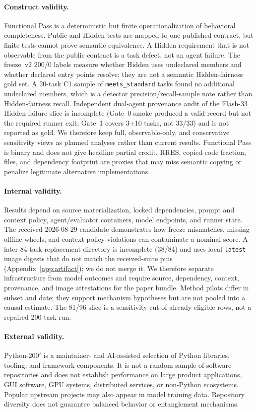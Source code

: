 \documentclass[acmsmall,anonymous,review,screen]{acmart}
\newcommand{\rres}{\textsc{RRES}\xspace}
\begin{document}
\paragraph{Construct validity.}
Functional Pass is a deterministic but finite operationalization of behavioral
completeness. Public and Hidden tests are mapped to one published contract, but
finite tests cannot prove semantic equivalence. A Hidden requirement that is
not observable from the public contract is a task defect, not an agent failure.
The freeze~v2 200/0 labels measure whether Hidden uses undeclared members and whether
declared entry points resolve; they are not a semantic Hidden-fairness gold
set. A 20-task C1 sample of \texttt{meets\_standard} tasks found no additional
undeclared members, which is a detector precision/recall-sample note rather
than Hidden-fairness recall. Independent dual-agent provenance audit of the
Flash-33 Hidden-failure slice is incomplete (Gate~0 smoke produced a valid
record but not the required runner exit; Gate~1 covers 3+10 tasks, not 33/33)
and is not reported as gold. We therefore keep full, observable-only, and
conservative sensitivity views as planned analyses rather than current
results. Functional Pass is binary and does not give headline partial credit.
\rres, copied-code fraction, files, and dependency footprint are proxies that
may miss semantic copying or penalize legitimate alternative implementations.

\paragraph{Internal validity.}
Results depend on source materialization, locked dependencies, prompt and
context policy, agent/evaluator containers, model endpoints, and runner state.
The received 2026-08-29 candidate demonstrates how freeze mismatches, missing
offline wheels, and context-policy violations can contaminate a nominal score.
A later 84-task replacement directory is incomplete (38/84) and uses local
\texttt{latest} image digests that do not match the received-suite pins
(Appendix~\ref{app:artifact}); we do not merge it. We therefore separate
infrastructure from model outcomes and require source, dependency, context,
provenance, and image attestations for the paper bundle. Method pilots differ
in subset and date; they support mechanism hypotheses but are not pooled into
a causal estimate. The 81/96 slice is a sensitivity cut of already-eligible
rows, not a repaired 200-task run.

\paragraph{External validity.}
Python-200$'$ is a maintainer- and AI-assisted selection of Python libraries,
tooling, and framework components. It is not a random sample of software
repositories and does not establish performance on large product applications,
GUI software, GPU systems, distributed services, or non-Python ecosystems.
Popular upstream projects may also appear in model training data. Repository
diversity does not guarantee balanced behavior or entanglement mechanisms.
\end{document}

